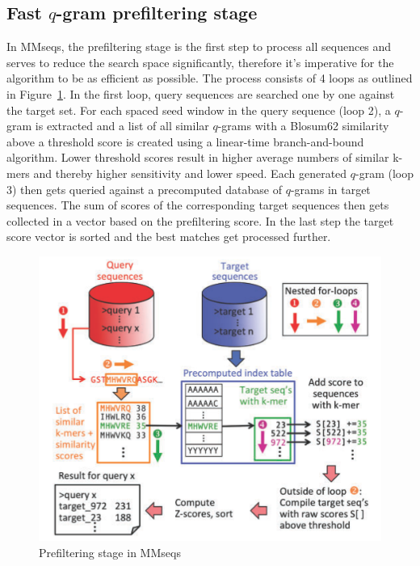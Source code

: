 \documentclass[twoside,a4paper,bsc]{master}
\newcommand{\Qgram}[1]{\(#1\)-gram}
\begin{document}
\subsection{Fast \Qgram{q} prefiltering stage}
In MMseqs, the prefiltering stage is the first step to process all
sequences and serves to reduce the search space significantly, therefore
it's imperative for the algorithm to be as efficient as possible. The
process consists of 4 loops as outlined in
Figure~\ref{fig:prefilterMMseqs}. In the first loop, query sequences are
searched one by one against the target set. For each spaced seed window in
the query sequence (loop 2), a \Qgram{q} is extracted and a list of all
similar \Qgram{q}s with a Blosum62 similarity above a threshold score is
created using a linear-time branch-and-bound algorithm. Lower threshold
scores result in higher average numbers of similar k-mers and thereby
higher sensitivity and lower speed. Each generated \Qgram{q} (loop 3) then
gets queried against a precomputed database of \Qgram{q}s in target
sequences. The sum of scores of the corresponding target sequences then
gets collected in a vector based on the prefiltering score. In the last
step the target score vector is sorted and the best matches get processed
further.
\begin{figure}[t]
\begin{center}
\includegraphics[scale=0.3]{graphics/MMseqs_prefilter.png}
\end{center}
\caption{Prefiltering stage in MMseqs~\cite{hauser2014mmseqs}}
\label{fig:prefilterMMseqs}
\end{figure}
\end{document}
